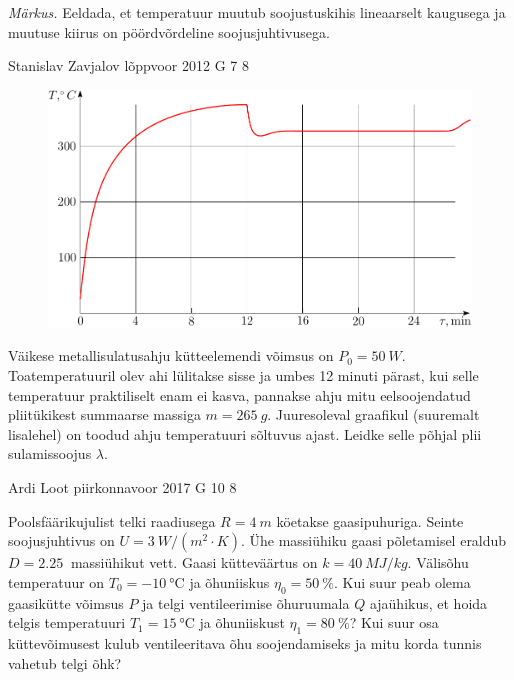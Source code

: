 \documentclass[11pt]{article}
\begin{document}
{{\emph{Märkus.} Eeldada, et temperatuur muutub soojustuskihis lineaarselt
kaugusega ja muutuse kiirus on pöördvõrdeline soojusjuhtivusega. 
\fi
}

{Stanislav Zavjalov} %
{lõppvoor} %
{2012} %
{G 7} %
{8} %
{
\ifStatement
\begin{figure}%
\includegraphics[width=\linewidth]{2012-v3g-07-ahi_graafik}%
\end{figure}
Väikese metallisulatusahju kütteelemendi võimsus on $P_0 = \SI{50}{W}$.
Toatemperatuuril olev ahi lülitakse sisse ja umbes 12 minuti pärast,
kui selle temperatuur praktiliselt enam ei kasva, pannakse ahju mitu
eelsoojendatud pliitükikest summaarse massiga $m = \SI{265}{g}$. Juuresoleval graafikul (suuremalt
lisalehel) on toodud
ahju temperatuuri sõltuvus ajast. Leidke selle põhjal plii sulamissoojus
$\lambda$.
\fi
}

{Ardi Loot} %
{piirkonnavoor} %
{2017} %
{G 10} %
{8} %
{
\ifStatement
Poolsfäärikujulist telki raadiusega $R=\SI{4}{m}$ köetakse
gaasipuhuriga. Seinte soojusjuhtivus on $U=\SI{3}{W/\left(m^{2}\cdot K\right)}$.
Ühe massiühiku gaasi põletamisel eraldub $D=\SI{2.25}{}$ massiühikut vett. Gaasi kütteväärtus on $k=\SI{40}{MJ/kg}$. Välisõhu temperatuur on $T_{0}=\SI{-10}{\celsius}$
ja õhuniiskus $\eta_{0}=\SI{50}{\percent}.$ Kui suur peab olema gaasikütte
võimsus $P$ ja telgi ventileerimise õhuruumala $Q$ ajaühikus, et hoida telgis
temperatuuri $T_{1}=\SI{15}{\celsius}$ ja õhuniiskust $\eta_{1}=\SI{80}{\percent}$?
Kui suur osa küttevõimusest kulub ventileeritava õhu soojendamiseks
ja mitu korda tunnis vahetub telgi õhk?

}}
\end{document}
